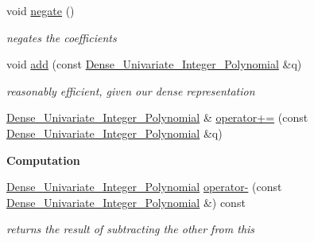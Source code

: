 \begin{Indent}
\begin{DoxyCompactItemize}
\mbox{\label{group__polygroup_ab3fd69e979b7b369064a3188e6b8a650}} 
void \hyperlink{group__polygroup_ab3fd69e979b7b369064a3188e6b8a650}{negate} ()
\begin{DoxyCompactList}\small\item\em negates the coefficients \end{DoxyCompactList}\item 
void \hyperlink{group__polygroup_a9aed4c0d2f30a93f79a11f8ab102601f}{add} (const \hyperlink{group__polygroup_class_dense___univariate___integer___polynomial}{Dense\+\_\+\+Univariate\+\_\+\+Integer\+\_\+\+Polynomial} \&q)
\begin{DoxyCompactList}\small\item\em reasonably efficient, given our dense representation \end{DoxyCompactList}\item 
\hyperlink{group__polygroup_class_dense___univariate___integer___polynomial}{Dense\+\_\+\+Univariate\+\_\+\+Integer\+\_\+\+Polynomial} \& \hyperlink{group__polygroup_ad3fcc4a1885e52b7c6c1814aac13b7b0}{operator+=} (const \hyperlink{group__polygroup_class_dense___univariate___integer___polynomial}{Dense\+\_\+\+Univariate\+\_\+\+Integer\+\_\+\+Polynomial} \&q)
\end{DoxyCompactItemize}
\end{Indent}
\begin{Indent}\textbf{ Computation}\par
\begin{DoxyCompactItemize}
\item 
\mbox{\label{group__polygroup_acd4d8a0d3e9e6704a6ea91e9c29cfea0}} 
\hyperlink{group__polygroup_class_dense___univariate___integer___polynomial}{Dense\+\_\+\+Univariate\+\_\+\+Integer\+\_\+\+Polynomial} \hyperlink{group__polygroup_acd4d8a0d3e9e6704a6ea91e9c29cfea0}{operator-\/} (const \hyperlink{group__polygroup_class_dense___univariate___integer___polynomial}{Dense\+\_\+\+Univariate\+\_\+\+Integer\+\_\+\+Polynomial} \&) const
\begin{DoxyCompactList}\small\item\em returns the result of subtracting the other from {\ttfamily this} \end{DoxyCompactList}\end{DoxyCompactItemize}
\end{Indent}
